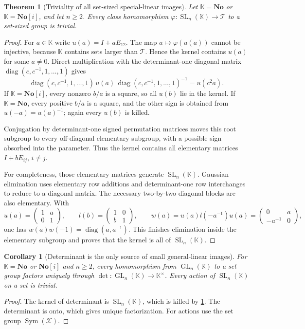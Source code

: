 \documentclass[11pt,letterpaper]{article}
\numberwithin{equation}{section}
\newtheorem{theorem}{Theorem}[section]
\newtheorem{corollary}[corollary]{Corollary}
\theoremstyle{definition}
\theoremstyle{remark}
\newcommand{\No}{\mathbf{No}}
\newcommand{\GL}{\operatorname{GL}}
\newcommand{\diag}{\operatorname{diag}}
\newcommand{\Sym}{\operatorname{Sym}}
\newcommand{\SL}{\operatorname{SL}}
\begin{document}
\begin{theorem}[Triviality of all set-sized special-linear images]\label{e3:cpt:thm:sl}
Let $\mathbb K=\No$ or $\mathbb K=\No[i]$, and let $n\ge2$. Every class
homomorphism $\varphi:\SL_n(\mathbb K)\to\mathcal T$ to a set-sized group is
trivial.
\end{theorem}
\begin{proof}
For $a\in\mathbb K$ write $u(a)=I+aE_{12}$. The map $a\mapsto\varphi(u(a))$
cannot be injective, because $\mathbb K$ contains sets larger than
$\mathcal T$. Hence the kernel contains $u(a)$ for some $a\ne0$. Direct
multiplication with the determinant-one diagonal matrix
$\diag(c,c^{-1},1,\ldots,1)$ gives
\begin{equation}\label{e3:cpt:eq:root-scaling}
 \diag(c,c^{-1},1,\ldots,1)\,u(a)\,\diag(c,c^{-1},1,\ldots,1)^{-1}=u(c^2a).
\end{equation}
If $\mathbb K=\No[i]$, every nonzero $b/a$ is a square, so all $u(b)$ lie in
the kernel. If $\mathbb K=\No$, every positive $b/a$ is a square, and the other
sign is obtained from $u(-a)=u(a)^{-1}$; again every $u(b)$ is killed.

Conjugation by determinant-one signed permutation matrices moves this root
subgroup to every off-diagonal elementary subgroup, with a possible sign
absorbed into the parameter. Thus the kernel contains all elementary matrices
$I+bE_{ij}$, $i\ne j$.

For completeness, those elementary matrices generate $\SL_n(\mathbb K)$.
Gaussian elimination uses elementary row additions and determinant-one row
interchanges to reduce to a diagonal matrix. The necessary two-by-two diagonal
blocks are also elementary. With
\[
 u(a)=\begin{pmatrix}1&a\\0&1\end{pmatrix},\qquad
 l(b)=\begin{pmatrix}1&0\\b&1\end{pmatrix},\qquad
 w(a)=u(a)l(-a^{-1})u(a)=\begin{pmatrix}0&a\\-a^{-1}&0\end{pmatrix},
\]
one has $w(a)w(-1)=\diag(a,a^{-1})$. This finishes elimination inside the
elementary subgroup and proves that the kernel is all of $\SL_n(\mathbb K)$.
\end{proof}

\begin{corollary}[Determinant is the only source of small general-linear images]\label{e3:cpt:cor:gl}
For $\mathbb K=\No$ or $\No[i]$ and $n\ge2$, every homomorphism from
$\GL_n(\mathbb K)$ to a set group factors uniquely through
$\det:\GL_n(\mathbb K)\to\mathbb K^\times$. Every action of $\SL_n(\mathbb K)$
on a set is trivial.
\end{corollary}
\begin{proof}
The kernel of determinant is $\SL_n(\mathbb K)$, which is killed by
\cref{e3:cpt:thm:sl}. The determinant is onto, which gives unique
factorization. For actions use the set group $\Sym(\mathcal X)$.
\end{proof}
\end{document}
